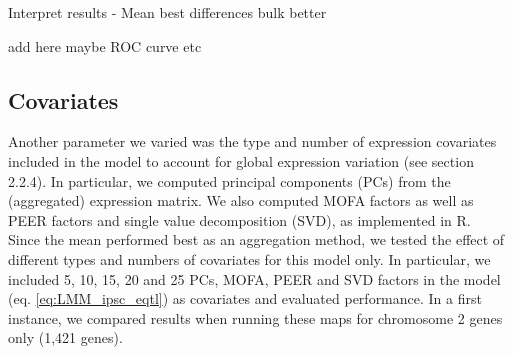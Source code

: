 
Interpret results - Mean best
differences 
bulk better

add here maybe ROC curve etc

\clearpage

\subsection{Covariates}


Another parameter we varied was the type and number of expression covariates included in the model to account for global expression variation (see section 
2.2.4).
In particular, we computed principal components (PCs) from the (aggregated) expression matrix.
We also computed MOFA factors \cite{argelaguet2018multi} as well as PEER factors \cite{stegle2010bayesian,stegle2012using} and single value decomposition (SVD), as implemented in R. \\

Since the mean performed best as an aggregation method, we tested the effect of different types and numbers of covariates for this model only.
In particular, we included 5, 10, 15, 20 and 25 PCs, MOFA, PEER and SVD factors in the model (eq. \eqref{eq:LMM_ipsc_eqtl}) as covariates and evaluated performance.
In a first instance, we compared results when running these maps for chromosome 2 genes only (1,421 genes). \\


